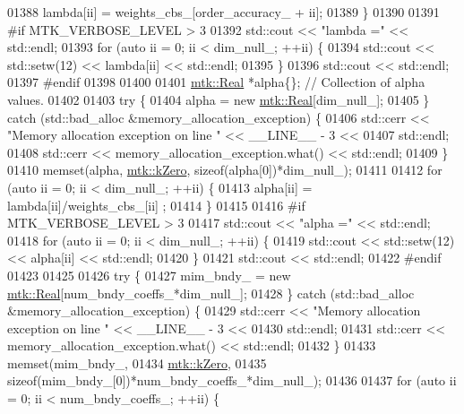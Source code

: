 \begin{DoxyCode}
{{01388     lambda[ii] = weights\_cbs\_[order\_accuracy\_ + ii];
01389   \}
01390 
01391 \textcolor{preprocessor}{  #if MTK\_VERBOSE\_LEVEL > 3}
01392   std::cout << \textcolor{stringliteral}{"lambda ="} << std::endl;
01393   \textcolor{keywordflow}{for} (\textcolor{keyword}{auto} ii = 0; ii < dim\_null\_; ++ii) \{
01394     std::cout << std::setw(12) << lambda[ii] << std::endl;
01395   \}
01396   std::cout << std::endl;
01397 \textcolor{preprocessor}{  #endif}
01398 
01400 
01401   \hyperlink{group__c01-roots_gac080bbbf5cbb5502c9f00405f894857d}{mtk::Real} *alpha\{\}; \textcolor{comment}{// Collection of alpha values.}
01402 
01403   \textcolor{keywordflow}{try} \{
01404     alpha = \textcolor{keyword}{new} \hyperlink{group__c01-roots_gac080bbbf5cbb5502c9f00405f894857d}{mtk::Real}[dim\_null\_];
01405   \} \textcolor{keywordflow}{catch} (std::bad\_alloc &memory\_allocation\_exception) \{
01406     std::cerr << \textcolor{stringliteral}{"Memory allocation exception on line "} << \_\_LINE\_\_ - 3 <<
01407       std::endl;
01408     std::cerr << memory\_allocation\_exception.what() << std::endl;
01409   \}
01410   memset(alpha, \hyperlink{group__c01-roots_ga59a451a5fae30d59649bcda274fea271}{mtk::kZero}, \textcolor{keyword}{sizeof}(alpha[0])*dim\_null\_);
01411 
01412   \textcolor{keywordflow}{for} (\textcolor{keyword}{auto} ii = 0; ii < dim\_null\_; ++ii) \{
01413     alpha[ii] = lambda[ii]/weights\_cbs\_[ii] ;
01414   \}
01415 
01416 \textcolor{preprocessor}{  #if MTK\_VERBOSE\_LEVEL > 3}
01417   std::cout << \textcolor{stringliteral}{"alpha ="} << std::endl;
01418   \textcolor{keywordflow}{for} (\textcolor{keyword}{auto} ii = 0; ii < dim\_null\_; ++ii) \{
01419     std::cout << std::setw(12) << alpha[ii] << std::endl;
01420   \}
01421   std::cout << std::endl;
01422 \textcolor{preprocessor}{  #endif}
01423 
01425 
01426   \textcolor{keywordflow}{try} \{
01427     mim\_bndy\_ = \textcolor{keyword}{new} \hyperlink{group__c01-roots_gac080bbbf5cbb5502c9f00405f894857d}{mtk::Real}[num\_bndy\_coeffs\_*dim\_null\_];
01428   \} \textcolor{keywordflow}{catch} (std::bad\_alloc &memory\_allocation\_exception) \{
01429     std::cerr << \textcolor{stringliteral}{"Memory allocation exception on line "} << \_\_LINE\_\_ - 3 <<
01430       std::endl;
01431     std::cerr << memory\_allocation\_exception.what() << std::endl;
01432   \}
01433   memset(mim\_bndy\_,
01434          \hyperlink{group__c01-roots_ga59a451a5fae30d59649bcda274fea271}{mtk::kZero},
01435          \textcolor{keyword}{sizeof}(mim\_bndy\_[0])*num\_bndy\_coeffs\_*dim\_null\_);
01436 
01437   \textcolor{keywordflow}{for} (\textcolor{keyword}{auto} ii = 0; ii < num\_bndy\_coeffs\_; ++ii) \{
}}
\end{DoxyCode}
